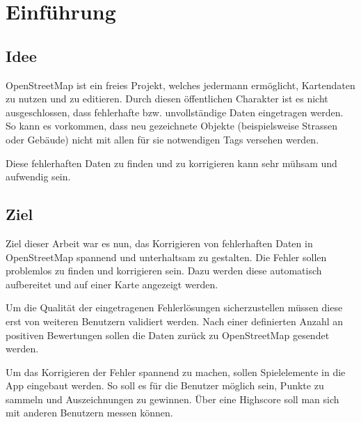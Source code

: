 \section{Einführung}

\subsection{Idee}
\gls{OpenStreetMap} ist ein freies Projekt, welches jedermann ermöglicht, Kartendaten zu nutzen und zu editieren.
Durch diesen öffentlichen Charakter ist es nicht ausgeschlossen, dass fehlerhafte bzw. unvollständige Daten eingetragen werden.
So kann es vorkommen, dass neu gezeichnete Objekte (beispielsweise Strassen oder Gebäude) nicht mit allen für sie notwendigen \glspl{Tag} versehen werden.

Diese fehlerhaften Daten zu finden und zu korrigieren kann sehr mühsam und aufwendig sein.

\subsection{Ziel}
Ziel dieser Arbeit war es nun, das Korrigieren von fehlerhaften Daten in \gls{OpenStreetMap} spannend und unterhaltsam zu gestalten.
Die Fehler sollen problemlos zu finden und korrigieren sein.
Dazu werden diese automatisch aufbereitet und auf einer Karte angezeigt werden.

Um die Qualität der eingetragenen Fehlerlösungen sicherzustellen müssen diese erst von weiteren Benutzern validiert werden.
Nach einer definierten Anzahl an positiven Bewertungen sollen die Daten zurück zu \gls{OpenStreetMap} gesendet werden.

Um das Korrigieren der Fehler spannend zu machen, sollen Spielelemente in die App eingebaut werden.
So soll es für die Benutzer möglich sein, Punkte zu sammeln und Auszeichnungen zu gewinnen. Über eine Highscore soll man sich mit anderen Benutzern messen können.